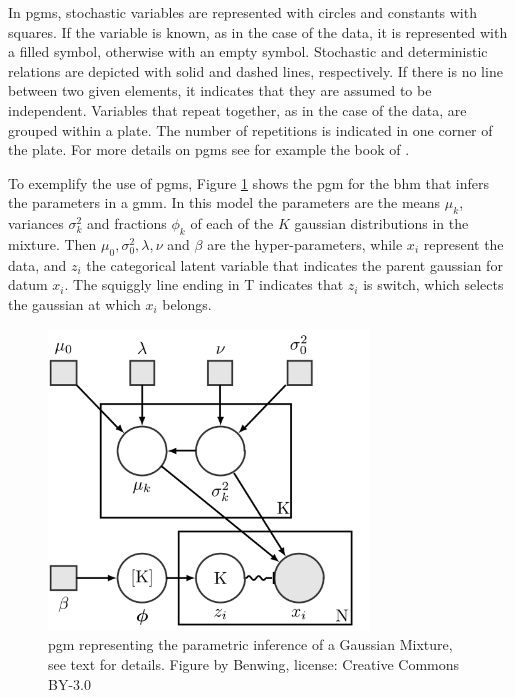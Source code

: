 In \glspl{pgm}, stochastic variables are represented with circles and constants with squares. If the variable is known, as in the case of the data, it is represented with a filled symbol, otherwise with an empty symbol. Stochastic and deterministic relations are depicted with solid and dashed lines, respectively. If there is no line between two given elements, it indicates that they are assumed to be independent. Variables that repeat together, as in the case of the data, are grouped within a plate. The number of repetitions is indicated in one corner of the plate. For more details on \glspl{pgm} see for example the book of \citet{Koller2009}. 

To exemplify the use of \glspl{pgm}, Figure \ref{fig:pgmGMM} shows the \gls{pgm} for the \gls{bhm}  that infers the parameters in a \gls{gmm}. In this model the parameters are the means $\mu_k$, variances $\sigma_k^2$ and fractions $\phi_k$ of each of the $K$ gaussian distributions in the mixture. Then $\mu_0,\sigma_0^2,\lambda,\nu$ and $\beta$ are the hyper-parameters, while $x_i$ represent the data, and $z_i$ the categorical latent variable that indicates the parent gaussian for datum $x_i$. The squiggly line ending in T indicates that $z_i$ is switch, which selects the gaussian at which $x_i$ belongs.

\begin{figure}[ht!]
\begin{center}
\includegraphics[height=8cm]{background/Figures/BGMM.png}
\caption{\gls{pgm} representing the parametric inference of a Gaussian Mixture, see text for details. Figure by Benwing, license: Creative Commons BY-3.0}
\label{fig:pgmGMM}
\end{center}
\end{figure}

